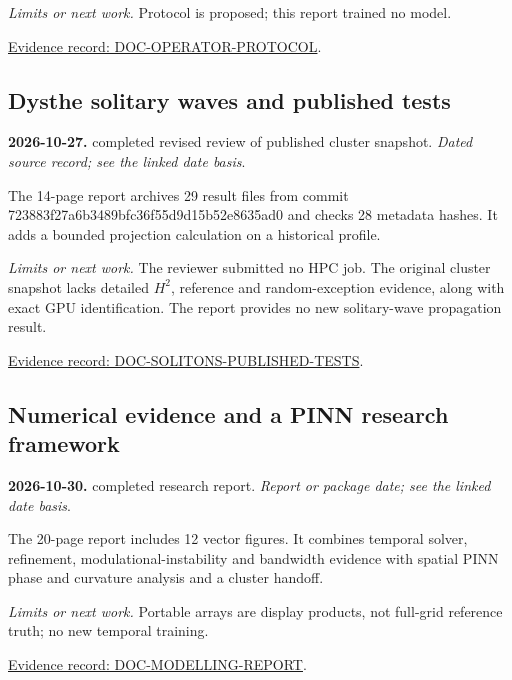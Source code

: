 \documentclass[11pt]{article}
\begin{document}
\noindent\textit{Limits or next work.} Protocol is proposed; this report trained no model.

\noindent\href{https://github.com/matasvai/dysthe-paper/blob/codex/research-record-2026-11-05/research-record/2026-11-05/README.md#doc-operator-protocol}{Evidence record: DOC-OPERATOR-PROTOCOL}.
\subsection*{Dysthe solitary waves and published tests}
\noindent\textbf{2026-10-27.} completed revised review of published cluster snapshot. \emph{Dated source record; see the linked date basis}.\par
The 14-page report archives 29 result files from commit 723883f2\allowbreak{}7a6b3489\allowbreak{}bfc36f55\allowbreak{}d9d15b52\allowbreak{}e8635ad0 and checks 28 metadata hashes. It adds a bounded projection calculation on a historical profile.

\noindent\textit{Limits or next work.} The reviewer submitted no HPC job. The original cluster snapshot lacks detailed $H^2$, reference and random-exception evidence, along with exact GPU identification. The report provides no new solitary-wave propagation result.

\noindent\href{https://github.com/matasvai/dysthe-paper/blob/codex/research-record-2026-11-05/research-record/2026-11-05/README.md#doc-solitons-published-tests}{Evidence record: DOC-SOLITONS-PUBLISHED-TESTS}.
\subsection*{Numerical evidence and a PINN research framework}
\noindent\textbf{2026-10-30.} completed research report. \emph{Report or package date; see the linked date basis}.\par
The 20-page report includes 12 vector figures. It combines temporal solver, refinement, modulational-instability and bandwidth evidence with spatial PINN phase and curvature analysis and a cluster handoff.

\noindent\textit{Limits or next work.} Portable arrays are display products, not full-grid reference truth; no new temporal training.

\noindent\href{https://github.com/matasvai/dysthe-paper/blob/codex/research-record-2026-11-05/research-record/2026-11-05/README.md#doc-modelling-report}{Evidence record: DOC-MODELLING-REPORT}.
\end{document}
